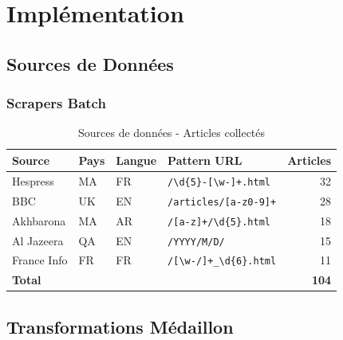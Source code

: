 \documentclass[12pt,a4paper]{report}
\begin{document}

\chapter{Implémentation}

\section{Sources de Données}

\subsection{Scrapers Batch}

\begin{table}[H]
    \centering
    \begin{tabular}{llllr}
        \toprule
        \textbf{Source} & \textbf{Pays} & \textbf{Langue} & \textbf{Pattern URL}                                        & \textbf{Articles} \\
        \midrule
        Hespress        & MA            & FR              & \texttt{/\textbackslash d\{5\}-[\textbackslash w-]+.html}   & 32                \\
        BBC             & UK            & EN              & \texttt{/articles/[a-z0-9]+}                                & 28                \\
        Akhbarona       & MA            & AR              & \texttt{/[a-z]+/\textbackslash d\{5\}.html}                 & 18                \\
        Al Jazeera      & QA            & EN              & \texttt{/YYYY/M/D/}                                         & 15                \\
        France Info     & FR            & FR              & \texttt{/[\textbackslash w-/]+\_\textbackslash d\{6\}.html} & 11                \\
        \midrule
        \textbf{Total}  &               &                 &                                                             & \textbf{104}      \\
        \bottomrule
    \end{tabular}
    \caption{Sources de données - Articles collectés}
\end{table}

\section{Transformations Médaillon}
\end{document}
